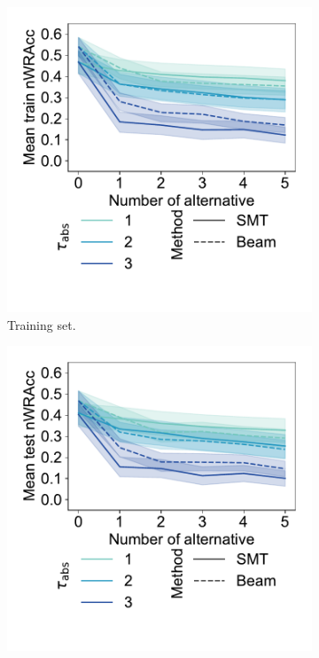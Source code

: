 \documentclass{article}
\theoremstyle{definition}
\begin{document}
\begin{figure}[t]
	\centering
	\begin{subfigure}[t]{0.48\textwidth}
		\centering
		\includegraphics[width=\textwidth, trim=15 50 15 15, clip]{plots/csd-alternatives-train-nwracc.pdf}
		\caption{Training set.}
		\label{fig:csd:alternatives-train-nwracc}
	\end{subfigure}
	\hfill
	\begin{subfigure}[t]{0.48\textwidth}
		\centering
		\includegraphics[width=\textwidth, trim=15 50 15 15, clip]{plots/csd-alternatives-test-nwracc.pdf}

\end{subfigure}
\end{figure}
\end{document}
